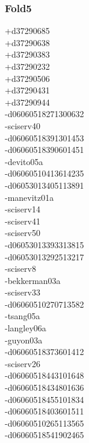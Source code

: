 \begin{multicols}{4}
\subsubsection*{Fold5}
+d37290685\\
+d37290638\\
+d37290383\\
+d37290232\\
+d37290506\\
+d37290431\\
+d37290944\\
-d06060518271300632\\
-sciserv40\\
-d06060518391301453\\
-d06060518390601451\\
-devito05a\\
-d06060510413614235\\
-d06053013405113891\\
-manevitz01a\\
-sciserv14\\
-sciserv41\\
-sciserv50\\
-d06053013393313815\\
-d06053013292513217\\
-sciserv8\\
-bekkerman03a\\
-sciserv33\\
-d06060510270713582\\
-tsang05a\\
-langley06a\\
-guyon03a\\
-d06060518373601412\\
-sciserv26\\
-d06060518443101648\\
-d06060518434801636\\
-d06060518455101834\\
-d06060518403601511\\
-d06060510265113565\\
-d06060518541902465\\

\end{multicols}
